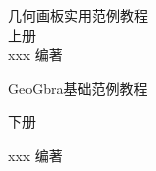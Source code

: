 \documentclass{ctexart}
\begin{document}
{\centering
{几何画板实用范例教程}\\[5mm]
上册\\[1.5mm]
xxx\,\,编著\\}\vspace{8mm}
\centerline{GeoGbra基础范例教程}\vspace{5mm}
\centerline{下册}\vspace{1.5mm}
\centerline{xxx\,\,编著}
\end{document}
